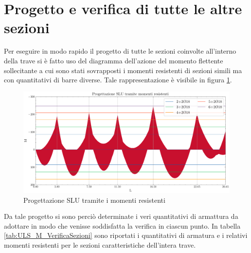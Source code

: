 \section{Progetto e verifica di tutte le altre sezioni}
Per eseguire in modo rapido il progetto di tutte le sezioni coinvolte all'interno della trave si è fatto uso del diagramma dell'azione del momento flettente sollecitante a cui sono stati sovrapposti i momenti resistenti di sezioni simili ma con quantitativi di barre diverse. 
Tale rappresentazione è visibile in figura \ref{fig:ULS_M_progettazioneTramiteMomentiResistenti}. 
\begin{figure}[htb]
  \centering
  \includegraphics[width=\textwidth]{IMG/ULS_M_progettazioneTramiteMomentiResistenti.pdf}
  \caption{Progettazione SLU tramite i momenti resistenti}
  \label{fig:ULS_M_progettazioneTramiteMomentiResistenti}
\end{figure}
Da tale progetto si sono perciò determinate i veri quantitativi di armattura da adottare in modo che venisse soddisfatta la verifica in ciascun punto.
In tabella \ref{tab:ULS_M_VerificaSezioni} sono riportati i quantitativi di armatura e i relativi momenti resistenti per le sezioni caratteristiche dell'intera trave.
%
